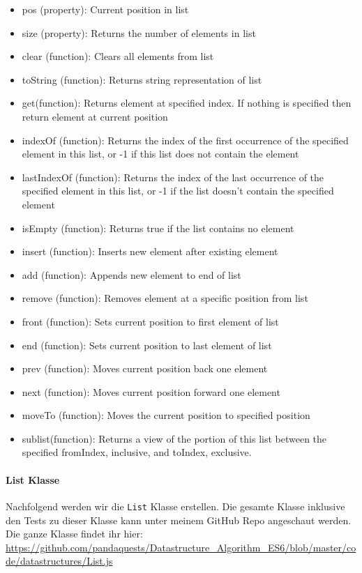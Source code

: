 \documentclass{book}
\begin{document}
\begin{itemize} 
	\item pos (property): Current position in list
	\item size (property): Returns the number of elements in list	
	\item clear (function): Clears all elements from list
	\item toString (function): Returns string representation of list
	\item get(function): Returns element at specified index. If nothing is specified then return element at current position
	\item indexOf (function): Returns the index of the first occurrence of the specified element in this list, or -1 if this list does not contain the element
	\item lastIndexOf (function): Returns the index of the last occurrence of the specified element in this list, or -1 if the list doesn't contain the specified element 
	\item isEmpty (function): Returns true if the list contains no element
	\item insert (function): Inserts new element after existing element
	\item add (function): Appends new element to end of list
	\item remove (function): Removes element at a specific position from list
	\item front (function): Sets current position to first element of list
	\item end (function): Sets current position to last element of list
	\item prev (function): Moves current position back one element
	\item next (function): Moves current position forward one element
	\item moveTo (function): Moves the current position to specified position	
	\item sublist(function): Returns a view of the portion of this list between the specified fromIndex, inclusive, and toIndex, exclusive. 
\end{itemize}

\paragraph{List Klasse}
Nachfolgend werden wir die \lstinline|List| Klasse erstellen. Die gesamte Klasse inklusive den Tests zu dieser Klasse kann unter meinem GitHub Repo angeschaut werden. Die ganze Klasse findet ihr hier: \url{https://github.com/pandaquests/Datastructure_Algorithm_ES6/blob/master/code/datastructures/List.js}
\end{document}
